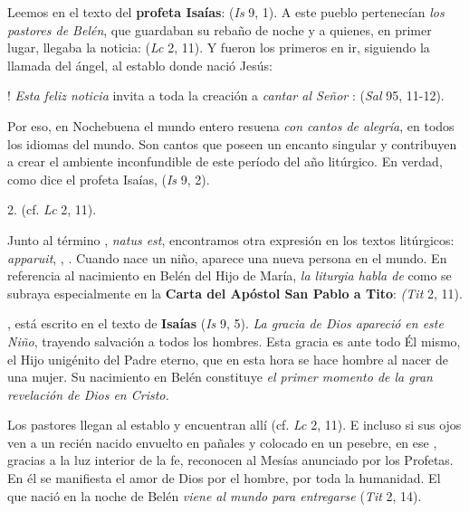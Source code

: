 \begin{body}
\begin{body}
		Leemos en el texto del \textbf{profeta Isaías}:  (\emph{Is} 9, 1). A este pueblo pertenecían \emph{los pastores de Belén}, que guardaban su rebaño de noche y a quienes, en primer lugar, llegaba la noticia:  (\emph{Lc} 2, 11). Y fueron los primeros en ir, siguiendo la llamada del ángel, al establo donde nació Jesús:
		
		! \emph{Esta feliz noticia} invita a toda la creación a \emph{cantar al Señor} :  (\emph{Sal} 95, 11-12).
		
		Por eso, en Nochebuena el mundo entero resuena \emph{con cantos de alegría}, en todos los idiomas del mundo. Son cantos que poseen un encanto singular y contribuyen a crear el ambiente inconfundible de este período del año litúrgico. En verdad, como dice el profeta Isaías,  (\emph{Is} 9, 2).
		
		2.  (cf. \emph{Lc} 2, 11).
		
		Junto al término , \emph{natus est}, encontramos otra expresión en los textos litúrgicos: \emph{apparuit}, , . Cuando nace un niño, aparece una nueva persona en el mundo. En referencia al nacimiento en Belén del Hijo de María, \emph{la liturgia habla de}  como se subraya especialmente en la \textbf{Carta del Apóstol San Pablo a Tito}:  \emph{(Tit} 2, 11).
		
		, está escrito en el texto de \textbf{Isaías} (\emph{Is} 9, 5). \emph{La gracia de Dios apareció en este Niño}, trayendo salvación a todos los hombres. Esta gracia es ante todo Él mismo, el Hijo unigénito del Padre eterno, que en esta hora se hace hombre al nacer de una mujer. Su nacimiento en Belén constituye \emph{el primer momento de la gran revelación de Dios en Cristo.}
		
		Los pastores llegan al establo y encuentran allí  (cf. \emph{Lc} 2, 11). E incluso si sus ojos ven a un recién nacido envuelto en pañales y colocado en un pesebre, en ese , gracias a la luz interior de la fe, reconocen al Mesías anunciado por los Profetas. En él se manifiesta el amor de Dios por el hombre, por toda la humanidad. El que nació en la noche de Belén \emph{viene al mundo para entregarse}  (\emph{Tit} 2, 14).
		

\end{body}
\end{body}
